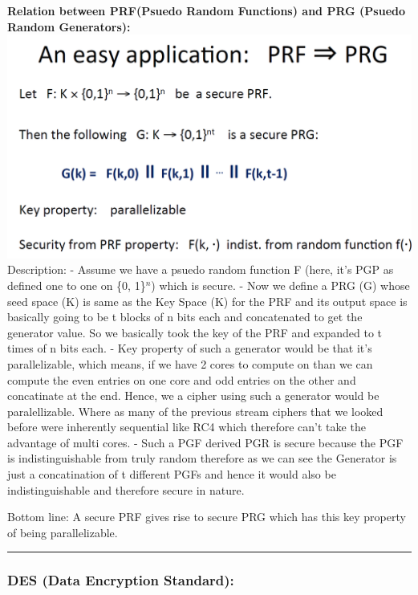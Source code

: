 \documentclass[11pt]{article}
\makeatletter
\def\maxwidth{\ifdim\Gin@nat@width>\linewidth\linewidth
    \else\Gin@nat@width\fi}
\let\Oldincludegraphics\includegraphics
\renewcommand{\includegraphics}[1]{\Oldincludegraphics[width=.8\maxwidth]{#1}}
\makeatother
\begin{document}
\textbf{Relation between PRF(Psuedo Random Functions) and PRG (Psuedo
Random Generators):} \includegraphics{./Images/PRF2PRG.png} Description:
- Assume we have a psuedo random function F (here, it's PGP as defined
one to one on \{0, 1\}\(^{n}\)) which is secure. - Now we define a PRG
(G) whose seed space (K) is same as the Key Space (K) for the PRF and
its output space is basically going to be t blocks of n bits each and
concatenated to get the generator value. So we basically took the key of
the PRF and expanded to t times of n bits each. - Key property of such a
generator would be that it's parallelizable, which means, if we have 2
cores to compute on than we can compute the even entries on one core and
odd entries on the other and concatinate at the end. Hence, we a cipher
using such a generator would be paralellizable. Where as many of the
previous stream ciphers that we looked before were inherently sequential
like RC4 which therefore can't take the advantage of multi cores. - Such
a PGF derived PGR is secure because the PGF is indistinguishable from
truly random therefore as we can see the Generator is just a
concatination of t different PGFs and hence it would also be
indistinguishable and therefore secure in nature.

Bottom line: A secure PRF gives rise to secure PRG which has this key
property of being parallelizable.

\begin{center}\rule{0.5\linewidth}{\linethickness}\end{center}

    \hypertarget{des-data-encryption-standard}{%
\subsubsection{DES (Data Encryption
Standard):}\label{des-data-encryption-standard}}
\end{document}
